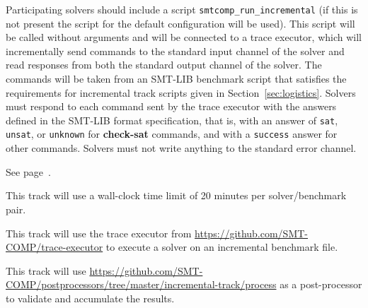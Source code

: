 \documentclass[12pt]{article}
\newcommand{\akey}[1]{\textbf{#1}\xspace}
\newcommand{\rem}[1]{\textcolor{red}{[#1]}}
\newcommand{\todo}[1]{\rem{TODO #1}}
\newcommand{\maintrack}{Single Query Track\xspace}
\newcommand{\inctrack}{Incremental Track\xspace}
\newcommand{\challtrack}{Industry-Challenge Track\xspace}
\begin{document}
Participating solvers should include a script
\texttt{smtcomp\_run\_incremental} (if this is not present the script
for the default configuration will be used). This script will be called
without arguments and will be connected to a trace executor, which
will incrementally send commands to the standard input channel of the
solver and read responses from both the standard output channel of the
solver.  The commands will be taken from an SMT-LIB benchmark script
that satisfies the requirements for incremental track scripts given in
Section~\ref{sec:logistics}.
%
Solvers must respond to each command sent by the trace executor with
the answers defined in the SMT-LIB format specification, that is, with
an answer of \texttt{sat}, \texttt{unsat}, or \texttt{unknown} for
\akey{check-sat} commands, and with a \texttt{success} answer for
other commands.
Solvers must not write anything to the standard error channel.

 See page~\pageref{benchmark-selection}.

This track will use a wall-clock time limit of 20 minutes per solver/benchmark
pair.

 This track will use the trace executor from
{\url{https://github.com/SMT-COMP/trace-executor}}
to execute a solver on an incremental benchmark file.

This track will use
{\url{https://github.com/SMT-COMP/postprocessors/tree/master/incremental-track/process}}
as a post-processor
to validate and accumulate the results.



\end{document}
